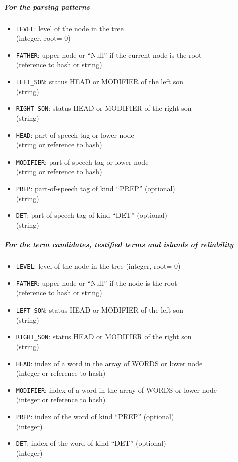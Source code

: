 \subparagraph{For the parsing patterns}

\begin{itemize}
\item \texttt{LEVEL}: level of the node in the tree\\
  (integer, root= 0)
\item \texttt{FATHER}: upper node or
  ``Null'' if the current node is the root \\(reference to hash or string)
\item \texttt{LEFT\_SON}: status HEAD or MODIFIER of the left
  son\\ (string)
\item \texttt{RIGHT\_SON}: status HEAD or MODIFIER of the
  right son \\(string)
\item \texttt{HEAD}: part-of-speech tag or lower
  node\\ (string or reference to hash)
\item \texttt{MODIFIER}:  part-of-speech tag or 
  lower node \\(string or reference to hash)
\item \texttt{PREP}: part-of-speech tag of kind ``PREP''  (optional)\\ (string)
\item \texttt{DET}: part-of-speech tag of kind ``DET''  (optional)\\ (string)
\end{itemize}

\subparagraph{For the term candidates, testified terms and islands of reliability}

\begin{itemize}
\item \texttt{LEVEL}: level of the node in the tree (integer, root= 0)
\item \texttt{FATHER}: upper node or ``Null'' if the
  node is the root\\ (reference to hash or string)
\item \texttt{LEFT\_SON}: status HEAD or MODIFIER of the left
  son\\ (string)
\item \texttt{RIGHT\_SON}: status HEAD or MODIFIER of the right son \\(string)
\item \texttt{HEAD}: index of a word in the array of
  WORDS or lower node\\ (integer or reference to hash)
\item \texttt{MODIFIER}:  index of a word in
  the array of WORDS or lower node \\(integer or reference to hash)
\item \texttt{PREP}: index of the word of kind ``PREP''  (optional)\\ (integer)
\item \texttt{DET}: index of the word of kind ``DET'' (optional)\\ (integer)
\end{itemize}


